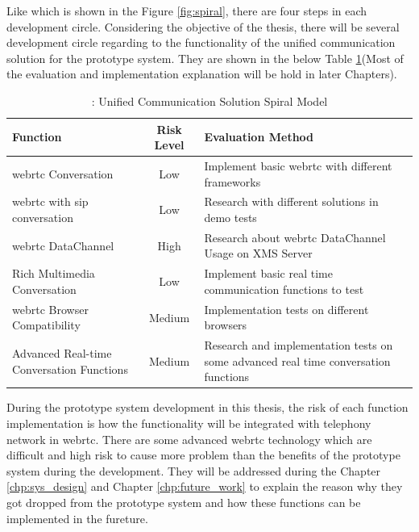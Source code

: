 \par Like which is shown in the Figure \ref{fig:spiral}, there are four steps in each development circle. Considering the objective of the thesis, there will be several development circle regarding to the functionality of the unified communication solution for the prototype system. They are shown in the below Table \ref{tab:spiral}(Most of the evaluation and implementation explanation will be hold in later Chapters).

\begin{table}
\caption{\label{tab:spiral}: Unified Communication Solution Spiral Model}
\centering
\begin{tabular}{| p{5cm} | c | p{5cm} |}
\hline
Function & Risk Level & Evaluation Method \\ \hline
\gls{webrtc} Conversation & Low & Implement basic \gls{webrtc} with different frameworks\\ \hline
\gls{webrtc} with \gls{sip} conversation & Low & Research with different solutions in demo tests \\ \hline
\gls{webrtc} DataChannel & High & Research about \gls{webrtc} DataChannel Usage on XMS Server \\ \hline
Rich Multimedia Conversation & Low & Implement basic real time communication functions to test \\ \hline
\gls{webrtc} Browser Compatibility & Medium & Implementation tests on different browsers \\ \hline
Advanced Real-time Conversation Functions & Medium & Research and implementation tests on some advanced real time conversation functions \\
\hline
\end{tabular} 
\end{table}


\par During the prototype system development in this thesis, the risk of each function implementation is how the functionality will be integrated with telephony network in \gls{webrtc}. There are some advanced \gls{webrtc} technology which are difficult and high risk to cause more problem than the benefits of the prototype system during the development. They will be addressed during the Chapter \ref{chp:sys_design} and Chapter \ref{chp:future_work} to explain the reason why they got dropped from the prototype system and how these functions can be implemented in the fureture.

